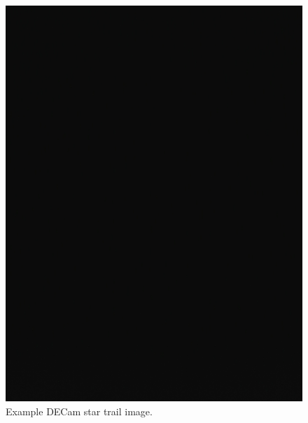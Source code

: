 \documentclass[11pt]{article}
\begin{document}

\begin{figure}[htb]
\center
\includegraphics[scale=0.2]{blank.jpg}
\caption{Example DECam star trail image.}
\label{fig:2}
\end{figure}
\end{document}
